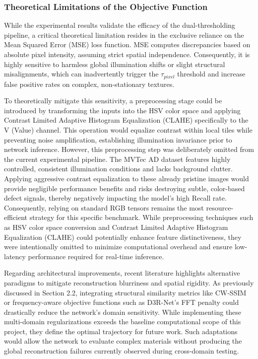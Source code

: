 \documentclass[10pt,twocolumn,a4paper]{article}
\begin{document}
\subsubsection{Theoretical Limitations of the Objective Function}


While the experimental results validate the efficacy of the dual-thresholding pipeline, a critical theoretical limitation resides in the exclusive reliance on the Mean Squared Error (MSE) loss function. MSE computes discrepancies based on absolute pixel intensity, assuming strict spatial independence. Consequently, it is highly sensitive to harmless global illumination shifts or slight structural misalignments, which can inadvertently trigger the $\tau_{pixel}$ threshold and increase false positive rates on complex, non-stationary textures.

To theoretically mitigate this sensitivity, a preprocessing stage could be introduced by transforming the inputs into the HSV color space and applying Contrast Limited Adaptive Histogram Equalization (CLAHE) specifically to the V (Value) channel. This operation would equalize contrast within local tiles while preventing noise amplification, establishing illumination invariance prior to network inference. However, this preprocessing step was deliberately omitted from the current experimental pipeline. The MVTec AD dataset features highly controlled, consistent illumination conditions and lacks background clutter. Applying aggressive contrast equalization to these already pristine images would provide negligible performance benefits and risks destroying subtle, color-based defect signals, thereby negatively impacting the model's high Recall rate. Consequently, relying on standard RGB tensors remains the most resource-efficient strategy for this specific benchmark. While preprocessing techniques such as HSV color space conversion and Contrast Limited Adaptive Histogram Equalization (CLAHE) could potentially enhance feature distinctiveness, they were intentionally omitted to minimize computational overhead and ensure low-latency performance required for real-time inference.

Regarding architectural improvements, recent literature highlights alternative paradigms to mitigate reconstruction blurriness and spatial rigidity. As previously discussed in Section 2.2, integrating structural similarity metrics like CW-SSIM or frequency-aware objective functions such as D3R-Net's FFT penalty could drastically reduce the network's domain sensitivity. While implementing these multi-domain regularizations exceeds the baseline computational scope of this project, they define the optimal trajectory for future work. Such adaptations would allow the network to evaluate complex materials without producing the global reconstruction failures currently observed during cross-domain testing.
	
\end{document}
